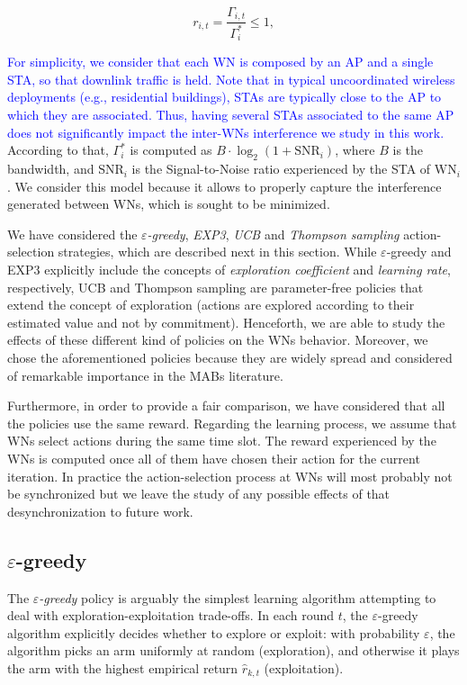 \documentclass[preprint,12pt]{elsarticle}
\newcommand{\francesc}[1]{\textcolor{blue}{#1}}
\begin{document}
\begin{equation}
r_{i,t} = {\frac{\Gamma_{i,t}}{{\Gamma_{i}^*}}} \leq 1,
\label{eq:reward_generation}
\nonumber
\end{equation}

\francesc{For simplicity, we consider that each WN is composed by an AP and a single STA, so that downlink traffic is held. Note that in typical uncoordinated wireless deployments (e.g., residential buildings), STAs are typically close to the AP to which they are associated. Thus, having several STAs associated to the same AP does not significantly impact the inter-WNs interference we study in this work.} According to that, $\Gamma_{i}^*$ is computed as $B \cdot \log_{2}(1 + \text{SNR}_{i})$, where $B$ is the bandwidth, and $\text{SNR}_{i}$ is the Signal-to-Noise ratio experienced by the STA of $\text{WN}_i$. We consider this model because it allows to properly capture the interference generated between WNs, which is sought to be minimized.

We have considered the \emph{$\varepsilon$-greedy}, \emph{EXP3}, \emph{UCB} and \emph{Thompson sampling} action-selection strategies, which are described next in this section. While $\varepsilon$-greedy and EXP3 explicitly include the concepts of \emph{exploration coefficient} and \emph{learning rate}, respectively, UCB and Thompson sampling are parameter-free policies that extend the concept of exploration (actions are explored according to their estimated value and not by commitment). Henceforth, we are able to study the effects of these different kind of policies on the WNs behavior. Moreover, we chose the aforementioned policies because they are widely spread and considered of remarkable importance in the MABs literature.

Furthermore, in order to provide a fair comparison, we have considered that all the policies use the same reward. Regarding the learning process, we assume that WNs select actions during the same time slot. The reward experienced by the WNs is computed once all of them have chosen their action for the current iteration. In practice the action-selection process at WNs will most probably not be synchronized but we leave the study of any possible effects of that desynchronization to future work.

\subsection{$\varepsilon$-greedy}
\label{section:bandits_egreedy}	
The \emph{$\varepsilon$-greedy} policy \cite{sutton1998reinforcement,auer2002finite} is arguably the simplest learning algorithm attempting to deal with exploration-exploitation trade-offs. In each round $t$, the $\varepsilon$-greedy algorithm explicitly decides whether to explore or exploit: with probability $\varepsilon$, the algorithm picks an arm uniformly at random (exploration), and otherwise it plays the arm with the highest empirical return $\hat{r}_{k,t}$ (exploitation). 
\end{document}
